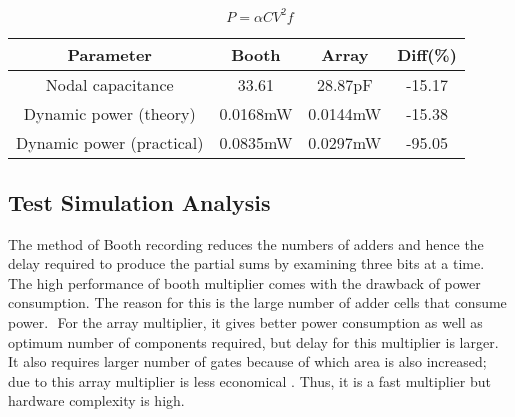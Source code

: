 \documentclass[conference]{IEEEtran}
\begin{document}
\[P = \alpha C V^2 f\]

\begin{table}[!htb]
\renewcommand{\arraystretch}{1.3}
\centering
\begin{tabular}{|c|c|c|c|}
\hline
Parameter​ & Booth & Array & Diff(\%) \\
\hline
Nodal capacitance & 33.61 & 28.87pF & -15.17  \\
\hline
Dynamic power (theory)​ & 0.0168mW & 0.0144mW & -15.38 \\
\hline
Dynamic power (practical) & 0.0835mW & 0.0297mW & -95.05 \\
\hline
\end{tabular}
\end{table}

\subsection{Test Simulation Analysis}
The method of Booth recording reduces the numbers of adders and hence the delay required to produce the partial sums by examining three bits at a time. The high performance of booth multiplier comes with the drawback of power consumption. The reason for this is the large number of adder cells that consume power. ​ For the array multiplier, it gives better power consumption as well as optimum number of components required, but delay for this multiplier is larger. It also requires larger number of gates because of which area is also increased; due to this array multiplier is less economical . Thus, it is a fast multiplier but hardware complexity is high.​

\end{document}
